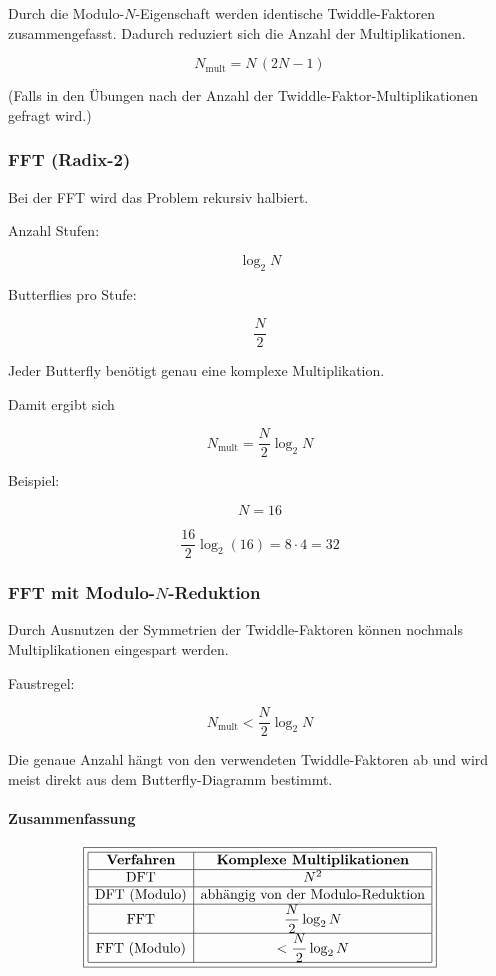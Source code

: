 Durch die Modulo-$N$-Eigenschaft werden identische Twiddle-Faktoren
zusammengefasst. Dadurch reduziert sich die Anzahl der Multiplikationen.

\[
\boxed{N_{\mathrm{mult}}
=
N\,(2N-1)}
\]

(Falls in den Übungen nach der Anzahl der Twiddle-Faktor-Multiplikationen gefragt wird.)

\vspace{0.5em}

\subsubsection*{FFT (Radix-2)}

Bei der FFT wird das Problem rekursiv halbiert.

Anzahl Stufen:

\[
\boxed{\log_2 N}
\]

Butterflies pro Stufe:

\[
\boxed{\frac{N}{2}}
\]

Jeder Butterfly benötigt genau eine komplexe Multiplikation.

Damit ergibt sich

\[
\boxed{
N_{\mathrm{mult}}
=
\frac{N}{2}\log_2 N
}
\]

Beispiel:

\[
N=16
\]

\[
\frac{16}{2}\log_2(16)
=
8\cdot4
=
32
\]

\vspace{0.5em}

\subsubsection*{FFT mit Modulo-$N$-Reduktion}

Durch Ausnutzen der Symmetrien der Twiddle-Faktoren können nochmals
Multiplikationen eingespart werden.

Faustregel:

\[
\boxed{
N_{\mathrm{mult}}
<
\frac{N}{2}\log_2 N
}
\]

Die genaue Anzahl hängt von den verwendeten Twiddle-Faktoren ab und wird
meist direkt aus dem Butterfly-Diagramm bestimmt.

\vspace{0.5em}

\paragraph{Zusammenfassung}

\[
\boxed{
\begin{array}{|c|c|}
\hline
\textbf{Verfahren} & \textbf{Komplexe Multiplikationen}\\
\hline
\text{DFT} & N^2\\
\hline
\text{DFT (Modulo)} & \text{abhängig von der Modulo-Reduktion}\\
\hline
\text{FFT} & \dfrac{N}{2}\log_2 N\\
\hline
\text{FFT (Modulo)} & < \dfrac{N}{2}\log_2 N\\
\hline
\end{array}
}
\]
\newpage